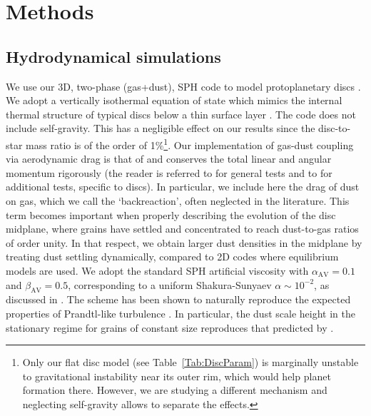 \documentclass[a4paper,fleqn,usenatbib]{mnras}
\begin{document}
\section{Methods}
\label{sec:Methods}

\subsection{Hydrodynamical simulations}
\label{sec:Hydro}

We use our 3D, two-phase (gas+dust), SPH code to model protoplanetary discs \citep{BF2005}. We adopt a vertically isothermal equation of state which mimics the internal thermal structure of typical discs below a thin surface layer \citep{Woitke2016}. The code does not include self-gravity. This has a negligible effect on our results since the disc-to-star mass ratio is of the order of 1\%\footnote{Only our flat disc model (see Table~\ref{Tab:DiscParam}) is marginally unstable to gravitational instability near its outer rim, which would help planet formation there. However, we are studying a different mechanism and neglecting self-gravity allows to separate the effects.}. Our implementation of gas-dust coupling via aerodynamic drag is that of \citet{Monaghan1997} and conserves the total linear and angular momentum rigorously (the reader is referred to \citealt{Monaghan1997} for general tests and to \citealt{Maddison1998} for additional tests, specific to discs). In particular, we include here the drag of dust on gas, which we call the `backreaction', often neglected in the literature. This term becomes important when properly describing the evolution of the disc midplane, where grains have settled and concentrated to reach dust-to-gas ratios of order unity. In that respect, we obtain larger dust densities in the midplane by treating dust settling dynamically, compared to 2D codes where equilibrium models are used. We adopt the standard SPH artificial viscosity \citep{Monaghan1989} with $\alpha_\mathrm{\scriptscriptstyle AV}=0.1$ and $\beta_\mathrm{\scriptscriptstyle AV}=0.5$, corresponding to a uniform Shakura-Sunyaev \citep{SS1973} $\alpha\sim10^{-2}$, as discussed in \citet{Fouchet2007}. The scheme has been shown to naturally reproduce the expected properties of Prandtl-like turbulence \citep{Arena2013}. In particular, the dust scale height in the stationary regime for grains of constant size reproduces that predicted by \citet{Dubrulle1995}.
\end{document}
